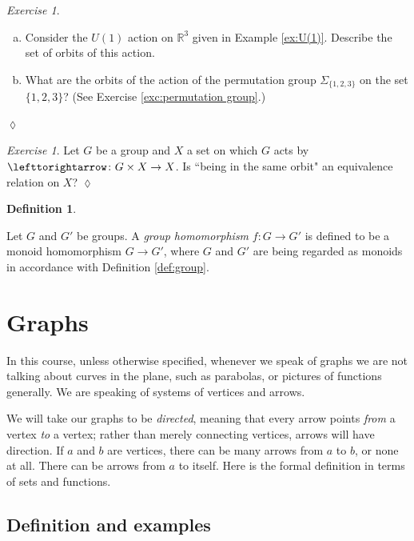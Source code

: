 \documentclass{book}
\def\RR{{\mathbb R}}
\def\to{\rightarrow}
\def\taking{\colon}
\def\acts{\lefttorightarrow}
\theoremstyle{remark}
\newtheorem{exc}[subsubsection]{Exercise}
\newenvironment{exercise}{\begin{exc}}{\hspace*{\fill}$\lozenge$\end{exc}}
\theoremstyle{definition}
\newtheorem{definition}[subsubsection]{Definition}
\def\sexc{\begin{enumerate}[a.)]\setlength{\itemsep}{.1cm}\setlength{\parskip}{.1cm}\item}
\def\next{\item}
\def\endsexc{\end{enumerate}}
\begin{document}
\begin{exercise}~
\sexc Consider the $U(1)$ action on $\RR^3$ given in Example \ref{ex:U(1)}. Describe the set of orbits of this action.
\next What are the orbits of the action of the permutation group $\Sigma_{\{1,2,3\}}$ on the set $\{1,2,3\}$? (See Exercise \ref{exc:permutation group}.)
\endsexc
\end{exercise}

\begin{exercise}
Let $G$ be a group and $X$ a set on which $G$ acts by $\acts\taking G\times X\to X$. Is ``being in the same orbit" an equivalence relation on $X$? 
\end{exercise}

\begin{definition}\label{def:group homomorphism}

Let $G$ and $G'$ be groups. A {\em group homomorphism} $f\taking G\to G'$ is defined to be a monoid homomorphism $G\to G'$, where $G$ and $G'$ are being regarded as monoids in accordance with Definition \ref{def:group}.

\end{definition}


\section{Graphs}\label{sec:graphs}

In this course, unless otherwise specified, whenever we speak of graphs we are not talking about curves in the plane, such as parabolas, or pictures of functions generally. We are speaking of systems of vertices and arrows.

We will take our graphs to be {\em directed}, meaning that every arrow points {\em from} a vertex {\em to} a vertex; rather than merely connecting vertices, arrows will have direction. If $a$ and $b$ are vertices, there can be many arrows from $a$ to $b$, or none at all. There can be arrows from $a$ to itself. Here is the formal definition in terms of sets and functions.


\subsection{Definition and examples}
\end{document}
